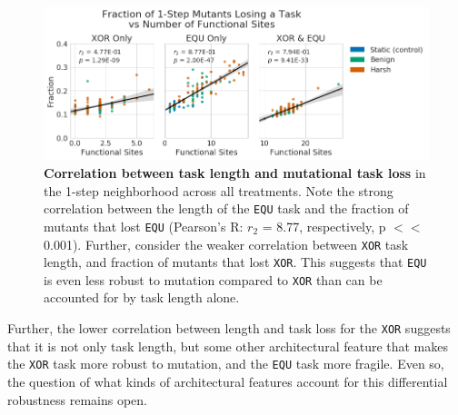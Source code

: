 \documentclass[PhD]{msu-thesis}
\begin{document}
	\begin{figure}[!h] %
	\includegraphics[trim={0.2cm 0 0 0.2cm},clip,width=0.95\columnwidth]{figures/CE/CCE_frac_1step_vs_func_sites.png}
	\caption{\textbf{Correlation between task length and mutational task loss} in the 1-step neighborhood across all treatments. Note the strong correlation between the length of the \texttt{EQU} task and the fraction of mutants that lost \texttt{EQU} (Pearson's R: $r_{2}$ = 8.77, respectively, p $<<$ 0.001). Further, consider the weaker correlation between \texttt{XOR} task length, and fraction of mutants that lost \texttt{XOR}. This suggests that \texttt{EQU} is even less robust to mutation compared to \texttt{XOR} than can be accounted for by task length alone.  
	}\label{fig:CCE_func_vs_single_step}
	\end{figure}	

Further, the lower correlation between length and task loss for the \texttt{XOR} suggests that it is not only task length, but some other architectural feature that makes the \texttt{XOR} task more robust to mutation, and the \texttt{EQU} task more fragile. Even so, the question of what kinds of architectural features account for this differential robustness remains open.
\end{document}
